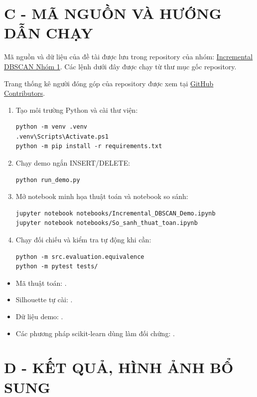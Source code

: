 \section*{C - MÃ NGUỒN VÀ HƯỚNG DẪN CHẠY}
{}

Mã nguồn và dữ liệu của đề tài được lưu trong repository của nhóm: \href{https://github.com/hoanganh-kevz/INCREMENTAL_DBSCAN_NHOM_1}{Incremental DBSCAN Nhóm 1}. Các lệnh dưới đây được chạy từ thư mục gốc repository.

Trang thống kê người đóng góp của repository được xem tại \href{https://github.com/hoanganh-kevz/INCREMENTAL_DBSCAN_NHOM_1/graphs/contributors?from=1\%2F8\%2F2026}{GitHub Contributors}.

\begin{enumerate}
    \item Tạo môi trường Python và cài thư viện:
\begin{verbatim}
python -m venv .venv
.venv\Scripts\Activate.ps1
python -m pip install -r requirements.txt
\end{verbatim}
    \item Chạy demo ngắn INSERT/DELETE:
\begin{verbatim}
python run_demo.py
\end{verbatim}
    \item Mở notebook minh họa thuật toán và notebook so sánh:
\begin{verbatim}
jupyter notebook notebooks/Incremental_DBSCAN_Demo.ipynb
jupyter notebook notebooks/So_sanh_thuat_toan.ipynb
\end{verbatim}
    \item Chạy đối chiếu và kiểm tra tự động khi cần:
\begin{verbatim}
python -m src.evaluation.equivalence
python -m pytest tests/
\end{verbatim}
\end{enumerate}

\begin{itemize}
    \item Mã thuật toán: .
    \item Silhouette tự cài: .
    \item Dữ liệu demo: .
    \item Các phương pháp scikit-learn dùng làm đối chứng: .
\end{itemize}

\section*{D - KẾT QUẢ, HÌNH ẢNH BỔ SUNG}
{}
\setcounter{figure}{0}
\renewcommand{\thefigure}{D.\arabic{figure}}

